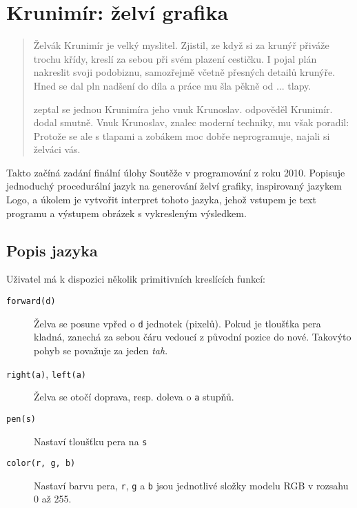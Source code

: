 \chapter{Krunimír: želví grafika}

\begin{quotation}

Želvák Krunimír je velký myslitel. Zjistil, ze když si za krunýř přiváže trochu
křídy, kreslí za sebou při svém plazení cestičku. I pojal plán nakreslit svoji
podobiznu, samozřejmě včetně přesných detailů krunýře. Hned se dal pln nadšení
do díla a práce mu šla pěkně od ... tlapy.

 zeptal se jednou Krunimíra jeho vnuk Krunoslav.
 odpověděl Krunimír.  dodal smutně.   Vnuk Krunoslav, znalec moderní techniky, mu
však poradil: 
Protože se ale s tlapami a zobákem moc dobře neprogramuje, najali si želváci
vás.

\end{quotation}

Takto začíná zadání finální úlohy Soutěže v programování z roku 2010. Popisuje
jednoduchý procedurální jazyk na generování želví grafiky, inspirovaný jazykem
Logo, a úkolem je vytvořit interpret tohoto jazyka, jehož vstupem je text
programu a výstupem obrázek s vykresleným výsledkem.

\section{Popis jazyka}

Uživatel má k dispozici několik primitivních kreslících funkcí:

\begin{description}
\item[\texttt{forward(d)}] Želva se posune vpřed o \texttt{d} jednotek (pixelů).
Pokud je tloušťka pera kladná, zanechá za sebou čáru vedoucí z původní pozice do
nové. Takovýto pohyb se považuje za jeden \emph{tah}.
\item[\texttt{right(a)}, \texttt{left(a)}] Želva se otočí doprava, resp. doleva o
\texttt{a} stupňů.
\item[\texttt{pen(s)}] Nastaví tloušťku pera na \texttt{s}
\item[\texttt{color(r, g, b)}] Nastaví barvu pera, \texttt{r}, \texttt{g} a
\texttt{b} jsou jednotlivé složky modelu RGB v rozsahu 0 až 255.
\end{description}

